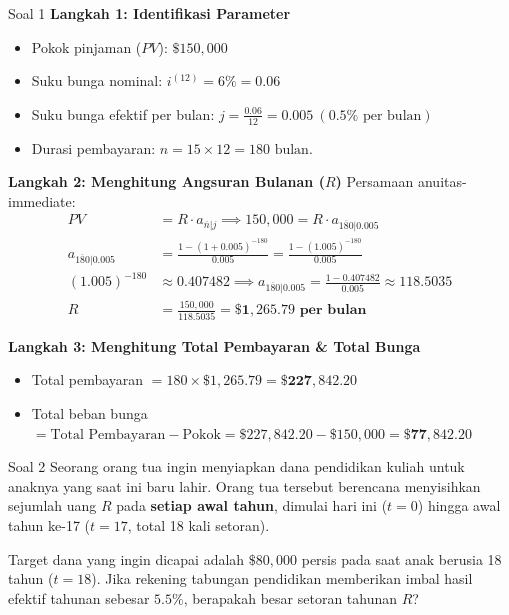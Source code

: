 \documentclass[11pt,a4paper]{article}
\begin{document}
\begin{solutionbox}{Soal 1}
\textbf{Langkah 1: Identifikasi Parameter}
\begin{itemize}
    \item Pokok pinjaman ($PV$): $\$150{,}000$
    \item Suku bunga nominal: $i^{(12)} = 6\% = 0.06$
    \item Suku bunga efektif per bulan: $j = \frac{0.06}{12} = 0.005 \ (0.5\% \text{ per bulan})$
    \item Durasi pembayaran: $n = 15 \times 12 = 180 \text{ bulan}$.
\end{itemize}

\textbf{Langkah 2: Menghitung Angsuran Bulanan ($R$)}
Persamaan anuitas-immediate:
\begin{align*}
    PV &= R \cdot a_{\overline{n}|j} \implies 150{,}000 = R \cdot a_{\overline{180}|0.005} \\[0.4em]
    a_{\overline{180}|0.005} &= \frac{1 - (1 + 0.005)^{-180}}{0.005} = \frac{1 - (1.005)^{-180}}{0.005} \\[0.4em]
    (1.005)^{-180} &\approx 0.407482 \implies a_{\overline{180}|0.005} = \frac{1 - 0.407482}{0.005} \approx 118.5035 \\[0.4em]
    R &= \frac{150{,}000}{118.5035} = \mathbf{\$1{,}265.79 \text{ per bulan}}
\end{align*}

\textbf{Langkah 3: Menghitung Total Pembayaran \& Total Bunga}
\begin{itemize}
    \item Total pembayaran $= 180 \times \$1{,}265.79 = \mathbf{\$227{,}842.20}$
    \item Total beban bunga $= \text{Total Pembayaran} - \text{Pokok} = \$227{,}842.20 - \$150{,}000 = \mathbf{\$77{,}842.20}$
\end{itemize}
\end{solutionbox}

\vspace{1.5em}

\begin{problembox}{Soal 2}
Seorang orang tua ingin menyiapkan dana pendidikan kuliah untuk anaknya yang saat ini baru lahir. Orang tua tersebut berencana menyisihkan sejumlah uang $R$ pada \textbf{setiap awal tahun}, dimulai hari ini ($t = 0$) hingga awal tahun ke-17 ($t = 17$, total 18 kali setoran).

Target dana yang ingin dicapai adalah $\$80{,}000$ persis pada saat anak berusia 18 tahun ($t = 18$). Jika rekening tabungan pendidikan memberikan imbal hasil efektif tahunan sebesar $5.5\%$, berapakah besar setoran tahunan $R$?
\end{problembox}
\end{document}
